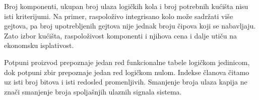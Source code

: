 Broj komponenti, ukupan broj ulaza logičkih kola i broj potrebnih kućišta nisu isti kriterijumi. Na primer, raspoloživo integrisano kolo može sadržati više gejtova, pa broj upotrebljenih gejtova nije jednak broju čipova koji se nabavljaju. Zato izbor kućišta, raspoloživost komponenti i njihova cena i dalje utiču na ekonomsku isplativost.

Potpuni proizvod prepoznaje jedan red funkcionalne tabele logičkom jedinicom, dok potpuni zbir prepoznaje jedan red logičkom nulom. Indekse članova čitamo uz isti broj bitova i isti redosled promenljivih. Smanjenje broja ulaza kapija ne znači smanjenje broja spoljašnjih ulaznih signala sistema.
